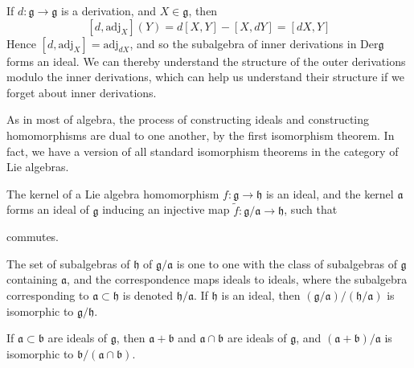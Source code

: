 \begin{example}
    If $d: \mathfrak{g} \to \mathfrak{g}$ is a derivation, and $X \in \mathfrak{g}$, then
    \[ [d,\text{adj}_X](Y) = d[X,Y] - [X,dY] = [dX,Y] \]
    Hence $[d,\text{adj}_X] = \text{adj}_{dX}$, and so the subalgebra of inner derivations in $\text{Der} \mathfrak{g}$ forms an ideal. We can thereby understand the structure of the outer derivations modulo the inner derivations, which can help us understand their structure if we forget about inner derivations.
\end{example}

As in most of algebra, the process of constructing ideals and constructing homomorphisms are dual to one another, by the first isomorphism theorem. In fact, we have a version of all standard isomorphism theorems in the category of Lie algebras.

\begin{theorem}
    The kernel of a Lie algebra homomorphism $f: \mathfrak{g} \to \mathfrak{h}$ is an ideal, and the kernel $\mathfrak{a}$ forms an ideal of $\mathfrak{g}$ inducing an injective map $\tilde{f}: \mathfrak{g}/\mathfrak{a} \to \mathfrak{h}$, such that
    \begin{center}
    \end{center}
    commutes.
\end{theorem}

\begin{theorem}
    The set of subalgebras of $\mathfrak{h}$ of $\mathfrak{g}/\mathfrak{a}$ is one to one with the class of subalgebras of $\mathfrak{g}$ containing $\mathfrak{a}$, and the correspondence maps ideals to ideals, where the subalgebra corresponding to $\mathfrak{a} \subset \mathfrak{h}$ is denoted $\mathfrak{h}/\mathfrak{a}$. If $\mathfrak{h}$ is an ideal, then $(\mathfrak{g}/\mathfrak{a})/(\mathfrak{h}/\mathfrak{a})$ is isomorphic to $\mathfrak{g}/\mathfrak{h}$.
\end{theorem}

\begin{theorem}
    If $\mathfrak{a} \subset \mathfrak{b}$ are ideals of $\mathfrak{g}$, then $\mathfrak{a} + \mathfrak{b}$ and $\mathfrak{a} \cap \mathfrak{b}$ are ideals of $\mathfrak{g}$, and $(\mathfrak{a} + \mathfrak{b})/\mathfrak{a}$ is isomorphic to $\mathfrak{b}/(\mathfrak{a} \cap \mathfrak{b})$.
\end{theorem}





